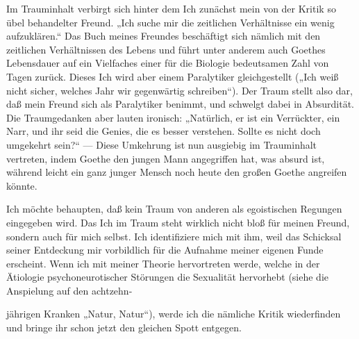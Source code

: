 \documentclass[twoside=true,titlepage=false,open=any, parskip=never, fontsize=10pt, headings=small, chapterprefix=false, appendixprefix=false]{scrbook}
\begin{document}
            
        \pstart
        Im Trauminhalt verbirgt sich hinter dem Ich zunächst mein von der Kritik so übel
               behandelter Freund. „Ich suche mir die zeitlichen
                  Verhältnisse ein wenig aufzuklären.“ Das Buch meines Freundes
               beschäftigt sich nämlich mit den
               zeitlichen Verhältnissen des Lebens und führt unter
               anderem auch Goethes Lebensdauer auf ein
               Vielfaches einer für die Biologie bedeutsamen Zahl von Tagen zurück. Dieses Ich
               wird aber einem Paralytiker gleichgestellt („Ich weiß
                  nicht sicher, welches Jahr wir gegenwärtig schreiben“). Der Traum stellt
               also dar, daß mein Freund sich als Paralytiker benimmt, und schwelgt
               dabei in Absurdität. Die Traumgedanken aber lauten ironisch: „Natürlich, er ist
               ein Verrückter, ein Narr, und ihr seid die Genies, die es besser verstehen.
               Sollte es nicht doch umgekehrt sein?“ — Diese
                  Umkehrung ist nun ausgiebig im Trauminhalt
               vertreten, indem Goethe den jungen Mann
               angegriffen hat, was absurd ist, während leicht ein ganz junger Mensch noch
               heute den großen Goethe angreifen könnte.
        \pend
    
            
        \pstart
        Ich möchte behaupten, daß kein Traum von anderen als egoistischen Regungen
               eingegeben wird. Das Ich im Traum steht wirklich nicht bloß für meinen Freund,
               sondern auch für mich selbst. Ich identifiziere mich mit ihm, weil das Schicksal
               seiner Entdeckung mir vorbildlich für die Aufnahme meiner eigenen Funde erscheint. Wenn ich mit meiner
               Theorie hervortreten werde, welche in der Ätiologie psychoneurotischer Störungen
               die Sexualität hervorhebt (siehe die Anspielung auf den achtzehn-
        \pend
    
         
            
            
            
        \pstart
        jährigen Kranken „Natur, Natur“), werde
               ich die nämliche Kritik wiederfinden und bringe ihr schon jetzt den gleichen
               Spott entgegen.
        \pend
    
\end{document}
